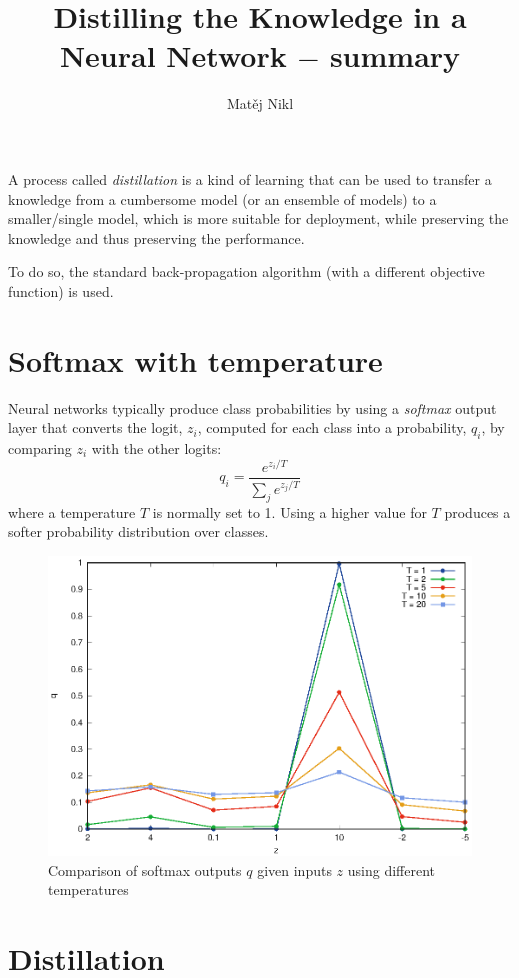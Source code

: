 \documentclass[a4paper,twocolumn]{article}
\title{Distilling the Knowledge in a Neural Network $-$ summary}
\author{Matěj Nikl}
\begin{document}
\maketitle
A process called \textit{distillation} is a kind of learning that can be used to transfer a knowledge from a cumbersome model (or an ensemble of models) to a smaller/single model, which is more suitable for deployment, while preserving the knowledge and thus preserving the performance.

To do so, the standard back-propagation algorithm (with a different objective function) is used.

\section{Softmax with temperature}
Neural networks typically produce class probabilities by using a \textit{softmax} output layer that converts the logit, $z_i$, computed for each class into a probability, $q_i$, by comparing $z_i$ with the other logits:
\[
    q_i = \frac{e^{z_i/T}}{\sum_j e^{z_j/T}}
\]
where a temperature $T$ is normally set to 1. Using a higher value for $T$ produces a softer probability distribution over classes.

\begin{figure}[!h]
    \includegraphics[width=\columnwidth]{softmax_example.eps}
    \caption{Comparison of softmax outputs $q$ given inputs $z$ using different temperatures}
\end{figure}

\section{Distillation}
\end{document}
